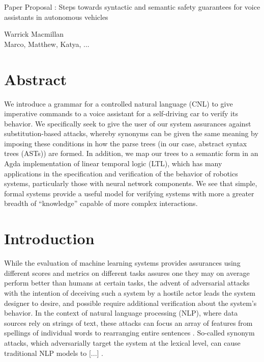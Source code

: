 \documentclass[a4paper, 11pt]{article}
\begin{document}

\begin{titlepage}

\vspace*{1cm}

\begin{center} \Large Paper Proposal : Steps towards syntactic and semantic
  safety guarantees for voice assistants in autonomous vehicles  \\ 


\vspace{1.5cm}

\large Warrick Macmillan  \\
\large Marco, Matthew, Katya, ... \end{center}

\end{titlepage}

\section{Abstract} 

We introduce a grammar for a controlled natural language (CNL) to give
imperative commands to a voice assistant for a self-driving car to 
verify its behavior. We specifically seek to give the user of our
system assurances against substitution-based attacks, whereby synonyms can be
given the same meaning by imposing these conditions in how the parse trees (in
our case, abstract syntax trees (ASTs)) are formed. In addition, we map our
trees to a semantic form in an Agda implementation of linear temporal logic
(LTL), which has many applications in the specification and verification of the
behavior of robotics systems, particularly those with neural network components.
We see that simple, formal systems provide a useful model for verifying systems
with more a greater breadth of ``knowledge'' capable of more complex
interactions.

\section{Introduction}

While the evaluation of machine learning systems provides assurances using
different scores and metrics on different tasks assures one they may on average
perform better than humans at certain tasks, the advent of adversarial attacks
\cite{szegedy} with the intention of deceiving such a system by a hostile actor
leads the system designer to desire, and possible require additional
verification about the system's behavior. In the context of natural language
processing (NLP), where data sources rely on strings of text, these attacks can
focus an array of features from spellings of individual words to rearranging
entire sentences \cite{}. So-called synonym attacks, which adversarially target
the system at the lexical level, can cause traditional NLP models to [...]
\cite{}.
\end{document}
